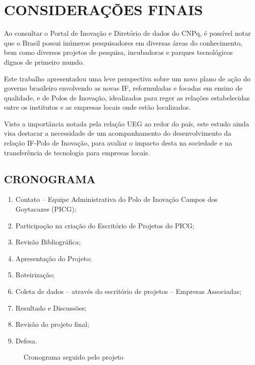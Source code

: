 \chapter{CONSIDERAÇÕES FINAIS}
\thispagestyle{empty}

Ao consultar o Portal de Inovação e Diretório de dados do CNPq, é possível notar que o Brasil possui inúmeros pesquisadores em diversas áreas do conhecimento, bem como diversos projetos de pesquisa, incubadoras e parques tecnológicos dignos de primeiro mundo.

Este trabalho apresentadou uma leve perspectiva sobre um novo plano de ação do governo brasileiro envolvendo as novas IF, reformuladas e focadas em ensino de qualidade, e de Polos de Inovação, idealizados para reger as relações estabelecidas entre os institutos e as empresas locais onde estão localizados.

Visto a importância notada pela relação UEG ao redor do país, este estudo ainda visa destacar a necessidade de um acompanhamento do desenvolvimento da relação IF-Polo de Inovação, para avaliar o impacto desta na sociedade e na transferência de tecnologia para empresas locais.

\section{CRONOGRAMA}

\begin{enumerate}
  \item{Contato – Equipe Administrativa do Polo de Inovação Campos dos Goytacazes (PICG);}
  \item{Participação na criação do Escritório de Projetos do PICG;}
  \item{Revisão Bibliográfica;}
  \item{Apresentação do Projeto;}
  \item{Roteirização;}
  \item{Coleta de dados – através do escritório de projetos – Empresas Associadas;}
  \item{Resultado e Discussões;}
  \item{Revisão do projeto final;}
  \item{Defesa.}
\end{enumerate}

\begin{figure}[ht]
  \centering
  \caption{Cronograma seguido pelo projeto}
  \label{crescimento_odf}
\end{figure}

